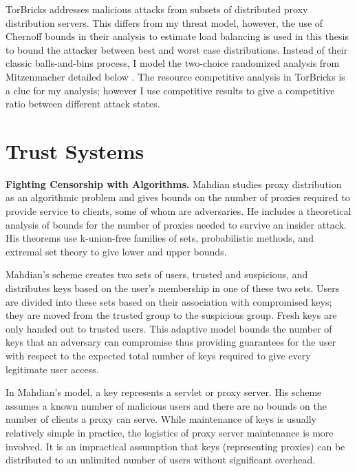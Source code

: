 TorBricks addresses malicious attacks from subsets of distributed proxy distribution servers. This differs from my threat model, however, the use of Chernoff bounds in their analysis to estimate load balancing is used in this thesis to bound the attacker between best and worst case distributions. Instead of their classic balls-and-bins process, I model the two-choice randomized analysis from Mitzenmacher detailed below \cite{mitzenmacher1996power}. The resource competitive analysis in TorBricks is a clue for my analysis; however I use competitive results to give a competitive ratio between different attack states.

\section{Trust Systems}


\textbf{Fighting Censorship with Algorithms.}
Mahdian \cite{mahdian2010fighting} studies proxy distribution as an algorithmic problem and gives bounds on the number of proxies required to provide service to clients, some of whom are adversaries. He includes a theoretical analysis of bounds for the number of proxies needed to survive an insider attack. His theorems use k-union-free families of sets, probabilistic methods, and extremal set theory to give lower and upper bounds. 

Mahdian's scheme creates two sets of users, trusted and suspicious, and distributes keys based on the user's membership in one of these two sets. Users are divided into these sets based on their association with compromised keys; they are moved from the trusted group to the suspicious group. Fresh keys are only handed out to trusted users. This adaptive model bounds the number of keys that an adversary can compromise thus providing guarantees for the user with respect to the expected total number of keys required to give every legitimate user access.

In Mahdian's model, a key represents a servlet or proxy server. His scheme assumes a known number of malicious users and there are no bounds on the number of clients a proxy can serve. While maintenance of keys is usually relatively simple in practice, the logistics of proxy server maintenance is more involved. It is an impractical assumption that keys (representing proxies) can be distributed to an unlimited number of users without significant overhead. 


